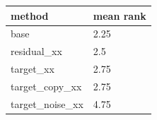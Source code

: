 \begin{tabular}{ll}
\toprule
method & mean rank \\
\midrule
base & 2.25 \\
residual\_xx & 2.5 \\
target\_xx & 2.75 \\
target\_copy\_xx & 2.75 \\
target\_noise\_xx & 4.75 \\
\bottomrule
\end{tabular}
